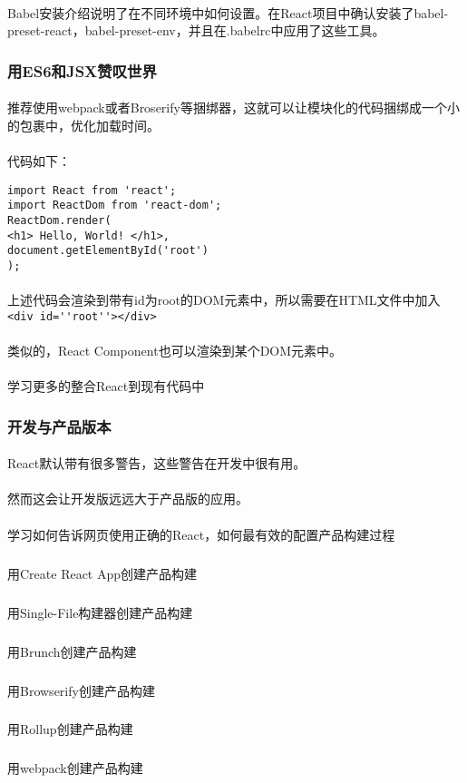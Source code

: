 \documentclass{book}
\begin{document}
\begin{CJK*}{UTF8}{gbsn}
\paragraph{}Babel安装介绍说明了在不同环境中如何设置。在React项目中确认安装了babel-preset-react，babel-preset-env，并且在.babelrc中应用了这些工具。
\subsubsection{用ES6和JSX赞叹世界}
\paragraph{}推荐使用webpack或者Broserify等捆绑器，这就可以让模块化的代码捆绑成一个小的包裹中，优化加载时间。
\paragraph{}代码如下：
\begin{verbatim}
import React from 'react';
import ReactDom from 'react-dom';
ReactDom.render(
<h1> Hello, World! </h1>,
document.getElementById('root')
);
\end{verbatim}
\paragraph{} 上述代码会渲染到带有id为root的DOM元素中，所以需要在HTML文件中加入\verb | <div id=''root''></div> |
\paragraph{}类似的，React Component也可以渲染到某个DOM元素中。
\paragraph{}学习更多的整合React到现有代码中
\subsubsection{开发与产品版本}
\paragraph{}React默认带有很多警告，这些警告在开发中很有用。
\paragraph{}然而这会让开发版远远大于产品版的应用。
\paragraph{}学习如何告诉网页使用正确的React，如何最有效的配置产品构建过程
\subparagraph{}用Create React App创建产品构建
\subparagraph{}用Single-File构建器创建产品构建
\subparagraph{}用Brunch创建产品构建
\subparagraph{}用Browserify创建产品构建
\subparagraph{}用Rollup创建产品构建
\subparagraph{}用webpack创建产品构建

\end{CJK*}
\end{document}
